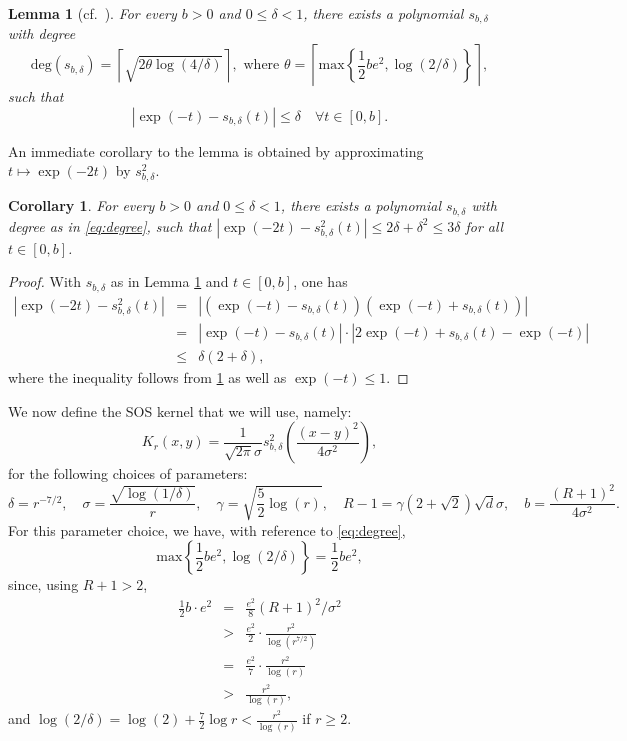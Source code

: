 \documentclass[11pt]{article}
\renewcommand{\max}{\mathrm{max}}
\newtheorem{corollary}[defin]{Corollary}
\newtheorem{lemma}[defin]{Lemma}
\theoremstyle{definition}
\begin{document}
\begin{lemma}[{cf.~\cite[Thrm~4.1]{sachdeva2014approx}}]
\label{lemma:sos approx exp}
    For every $b>0$ and $0 \le \delta <1$, there exists a polynomial $s_{b,\delta}$ with degree
    \begin{equation}
    \label{eq:degree}
    \mathrm{deg}(s_{b,\delta}) = \left\lceil\sqrt{2{\theta}\log (4/\delta)} \right\rceil, \mbox{ where }
  {\theta} =
   \left\lceil\max\left\{\frac{1}{2}be^2,\log(2/\delta)\right\}\right\rceil,
    \end{equation}
    such that
    \[
    |\exp(-t)- s_{b,\delta}(t)| \le \delta \quad \forall t \in [0,b].
    \]
\end{lemma}
An immediate corollary to the lemma is obtained by approximating $t \mapsto \exp(-2t)$ by $s_{b,\delta}^2$.

\begin{corollary} \label{cor:supexp}
      For every $b>0$ and $0 \le \delta <1$, there exists a polynomial $s_{b,\delta}$ with degree as in \eqref{eq:degree},
    such that
$|\exp(-2t)- s_{b,\delta}^2(t)| \le 2\delta + \delta^2 \leq 3\delta$ for all $t \in [0,b]$.
\end{corollary}
{
\begin{proof}
With $s_{b,\delta}$  as in Lemma \ref{lemma:sos approx exp} and $t \in [0,b]$, one has
\begin{eqnarray*}
  |\exp(-2t)- s_{b,\delta}^2(t)|  &=& |(\exp(-t)- s_{b,\delta}(t))(\exp(-t)+ s_{b,\delta}(t))|  \\
   &=& |\exp(-t)- s_{b,\delta}(t)|\cdot |2\exp(-t)+ s_{b,\delta}(t)-\exp(-t)| \\
   &\le & \delta(2 + \delta),
\end{eqnarray*}
where the inequality follows from \cref{lemma:sos approx exp} as well as $\exp(-t) \le 1$.
\end{proof}
}

We now define the SOS kernel that we will use, namely:
\[
K_r(x,y) = \frac{1}{\sqrt{2\pi}\sigma} s^2_{b,\delta}\left(\frac{(x-y)^2}{4\sigma^2} \right),
\]
for the following choices of parameters:
\begin{equation} \label{eq:values2}
\delta = r^{-7/2}, \quad \sigma = \frac{\sqrt{\log(1/\delta)}}{r}, \quad \gamma = \sqrt{\frac{5}{2}\log(r)}, \quad R -1 = \gamma (2+\sqrt{2})\sqrt{d}\sigma, \quad b =  \frac{(R+1)^2}{4 \sigma^2}.
\end{equation}
{
For this parameter choice, we have, with reference to \eqref{eq:degree},
\[
\max\left\{\frac{1}{2}be^2,\log(2/\delta)\right\} = \frac{1}{2}be^2,
\]
since, using $R+1 > 2$,
\begin{eqnarray*}
\frac{1}{2} b \cdot e^2
&=& \frac{e^2}{8} (R+1)^2/\sigma^2 \\
&>& \frac{e^2}{2} \cdot \frac{r^2}{\log(r^{7/2})}\\
&=& \frac{e^2}{7} \cdot \frac{r^2}{\log(r)}\\
&>& \frac{r^2}{\log(r)},
\end{eqnarray*}
and $\log(2/\delta) = \log(2) + \frac{7}{2}\log r < \frac{r^2}{\log(r)}$ if $r \ge 2$.}
\end{document}
